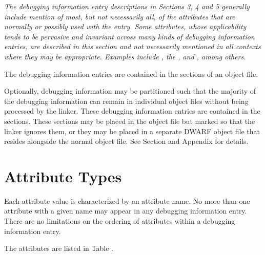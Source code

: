 \textit{The debugging information entry descriptions 
in Sections 3, 4 and 5 generally include mention of
most, but not necessarily all, of the attributes 
that are normally or possibly used with the entry.
Some attributes, whose applicability tends to be 
pervasive and invariant across many kinds of
debugging information entries, are described in 
this section and not necessarily mentioned in all
contexts where they may be appropriate. 
Examples include 
\DWATartificial, 
the , and 
\DWATdescription, 
among others.}

The debugging information entries are contained in the 
\dotdebuginfo{} sections of an object file.

Optionally, debugging information may be partitioned such
that the majority of the debugging information can remain in
individual object files without being processed by the
linker. These debugging information entries are contained in
the \dotdebuginfodwo{} sections. These
sections may be placed in the object file but marked so that
the linker ignores them, or they may be placed in a separate
DWARF object file that resides alongside the normal object
file. See Section  and
Appendix  for details.


\section{Attribute Types}
\label{chap:attributetypes}
Each attribute value is characterized by an attribute name. 
No more than one attribute with a given name may appear in any
debugging information entry. 
There are no limitations on the
ordering of attributes within a debugging information entry.

The attributes are listed in Table .  

